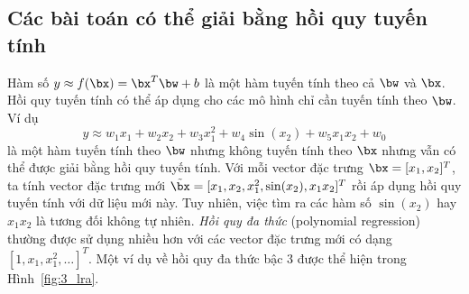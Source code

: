 \subsection{Các bài toán có thể giải bằng hồi quy tuyến tính}
Hàm số $y \approx f(\bx)= \bx^T\bw + b$ là một hàm tuyến tính
theo cả $ \bw$ và $\bx$. Hồi quy tuyến tính có thể áp
dụng cho các mô hình chỉ cần tuyến tính theo $\bw$. Ví dụ
\begin{equation}
y \approx w_1 x_1 + w_2 x_2 + w_3 x_1^2 +w_4 \sin(x_2) + w_5 x_1x_2 + w_0
\end{equation}
là một hàm tuyến tính theo $\bw$ nhưng không tuyến tính theo $\bx$ nhưng vẫn có thể được giải bằng
hồi quy tuyến tính. Với mỗi vector đặc trưng $\bx=[x_1, x_2]^T $, ta
tính vector đặc trưng mới $\tilde{\bx} = [x_1, x_2, x_1^2,
\sin(x_2), x_1x_2]^T$ rồi áp dụng hồi quy tuyến tính với dữ liệu mới này. Tuy
nhiên, việc tìm ra các hàm số $\sin(x_2)$ hay $x_1x_2$ là tương đối
{không tự nhiên}. \textit{Hồi quy đa thức} (polynomial regression) thường được sử dụng nhiều hơn với các vector đặc trưng mới có dạng
$[1, x_1, x_1^2, \dots]^T$. Một ví dụ về hồi quy đa thức bậc 3 được thể hiện
trong Hình~\ref{fig:3_lra}.


